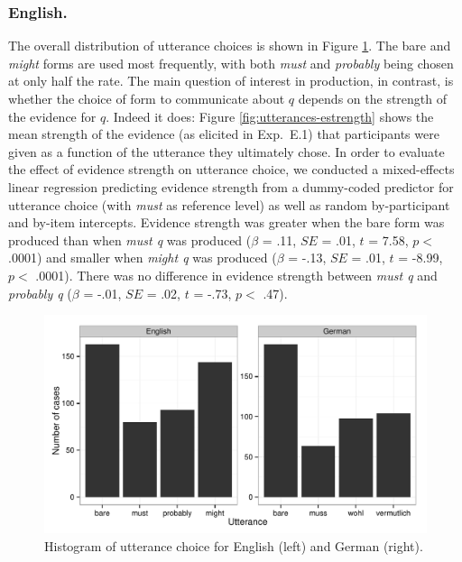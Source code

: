 \documentclass[11pt]{article}
\newcommand{\figref}[1]{Figure \ref{#1}}
\begin{document}
\subsubsection{English.} The overall distribution of utterance choices is shown in \figref{fig:utterances}. The bare and \emph{might} forms are used most frequently, with both \emph{must} and \emph{probably} being chosen at only half the rate. The main question of interest in production, in contrast, is whether the choice of form to communicate about $q$ depends on the strength of the evidence for $q$. Indeed it does: \figref{fig:utterances-estrength} shows the mean strength of the evidence (as elicited in Exp.~E.1) that participants were given as a function of the utterance they ultimately chose.   In order to evaluate the effect of evidence strength on utterance choice, we conducted a mixed-effects linear regression predicting evidence strength from a dummy-coded predictor for utterance choice (with \emph{must} as reference level) as well as random by-participant and by-item  intercepts. Evidence strength was greater when the bare form was produced than when \emph{must q} was produced ($\beta$ = .11, $SE$ = .01, $t$ = 7.58, $p <$ .0001) and smaller when \emph{might q} was produced  ($\beta$ = -.13, $SE$ = .01, $t$ = -8.99, $p <$ .0001). There was no difference in evidence strength between \emph{must q} and \emph{probably q}  ($\beta$ = -.01, $SE$ = .02, $t$ = -.73, $p <$ .47). 

\begin{figure}
\centering
\includegraphics[width=.9\textwidth]{pics/production-distribution}
\caption{Histogram of utterance choice for English (left) and German (right).}
\label{fig:utterances}
\end{figure}
\end{document}
